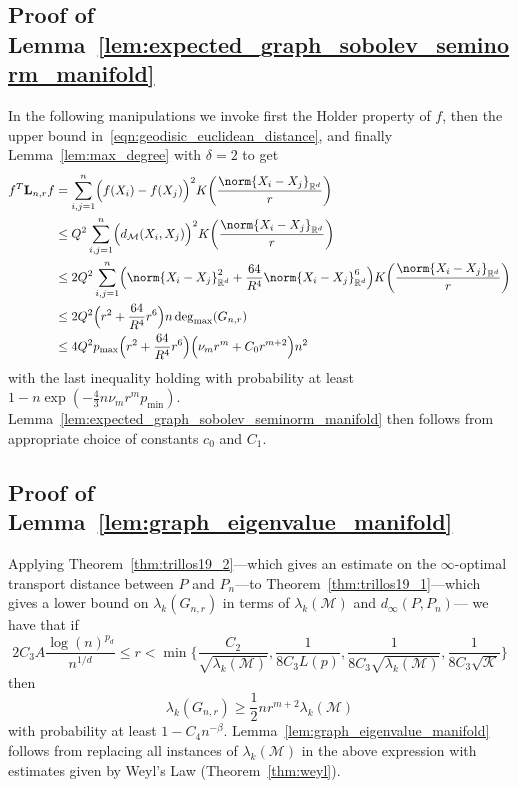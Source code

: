 \documentclass{article}
\newcommand{\Reals}{\mathbb{R}}
\newcommand{\1}{\mathbf{1}}
\newcommand{\Rd}{\Reals^d}
\newcommand{\Lap}{{\bf L}}
\newcommand{\mc}[1]{\mathcal{#1}}
\theoremstyle{alden}
\theoremstyle{aldenthm}
\theoremstyle{definition}
\theoremstyle{remark}
\begin{document}
\subsection{Proof of Lemma~\ref{lem:expected_graph_sobolev_seminorm_manifold}}
In the following manipulations we invoke first the Holder property of $f$, then the upper bound in~\ref{eqn:geodisic_euclidean_distance}, and finally Lemma~\ref{lem:max_degree} with $\delta = 2$ to get
\begin{align*}
f^T \Lap_{n,r}f  & = \sum_{i,j = 1}^{n} \Bigl(f(X_i) - f(X_j)\Bigr)^2 K\biggl(\frac{\norm{X_i - X_j}_{\Rd}}{r}\biggr) \\
& \leq Q^2 \sum_{i,j = 1}^{n} \Bigl(d_{\mc{M}}(X_i,X_j)\Bigr)^2 K\biggl(\frac{\norm{X_i - X_j}_{\Rd}}{r}\biggr) \\
& \leq 2 Q^2 \sum_{i,j = 1}^{n} \Bigl(\norm{X_i - X_j}_{\Rd}^2 + \frac{64}{R^4} \norm{X_i - X_j}_{\Rd}^6\Bigr) K\biggl(\frac{\norm{X_i - X_j}_{\Rd}}{r}\biggr) \\ 
& \leq 2 Q^2 \Bigl(r^2 + \frac{64}{R^4} r^6\Bigr) n \deg_{\max}(G_{n,r}) \\
& \leq 4 Q^2 p_{\max}\Bigl(r^2 + \frac{64}{R^4} r^6\Bigr) \Bigl(\nu_mr^m + C_0r^{m + 2}\Bigr) n^2  
\end{align*}
with the last inequality holding with probability at least $1 - n\exp(-\frac{4}{3}n\nu_mr^mp_{\min})$. Lemma~\ref{lem:expected_graph_sobolev_seminorm_manifold} then follows from appropriate choice of constants $c_0$ and $C_1$.
\subsection{Proof of Lemma~\ref{lem:graph_eigenvalue_manifold}}

Applying Theorem~\ref{thm:trillos19_2}---which gives an estimate on the $\infty$-optimal transport distance between $P$ and $P_n$---to Theorem~\ref{thm:trillos19_1}---which gives a lower bound on $\lambda_k(G_{n,r})$ in terms of $\lambda_k(\mc{M})$ and $d_{\infty}(P,P_n)$--- we have that if
\begin{equation*}
2C_3 A \frac{\log(n)^{p_d}}{n^{1/d}} \leq r < \min\biggl\{\frac{C_2}{\sqrt{\lambda_k(\mc{M})}}, \frac{1}{8C_3 L(p)}, \frac{1}{8C_3\sqrt{\lambda_k(\mc{M})}}, \frac{1}{8C_3\sqrt{\mc{K}}}\biggr\}
\end{equation*}
then
\begin{equation*}
\lambda_k(G_{n,r}) \geq \frac{1}{2} nr^{m+2}\lambda_k(\mc{M})
\end{equation*}
with probability at least $1 - C_4 n^{-\beta}$. Lemma~\ref{lem:graph_eigenvalue_manifold} follows from replacing all instances of $\lambda_k(\mc{M})$ in the above expression with estimates given by Weyl's Law (Theorem~\ref{thm:weyl}).
\end{document}
